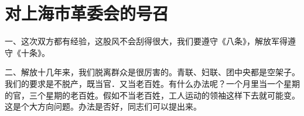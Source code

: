 \section[对上海市革委会的号召（一九六七年五月）]{对上海市革委会的号召}


一、这次双方都有经验，这股风不会刮得很大，我们要遵守《八条》，解放军得遵守《十条》。

二、解放十几年来，我们脱离群众是很厉害的。青联、妇联、团中央都是空架子。我们的要求是不脱产，既当官．又当老百姓。有什么办法呢？一个月里当一个星期的官，三个星期的老百姓。假如不当老百姓，工人运动的领袖这样下去就可能变。这是个大方向问题。办法是否好，同志们可以提出来。



